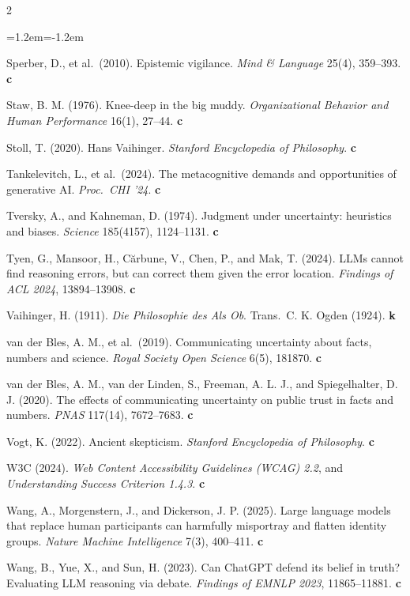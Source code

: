 \documentclass[11pt,a4paper]{article}
\newcounter{art}
\begin{document}
\begin{multicols}{2}
\begin{list}{}{\leftmargin=1.2em\itemindent=-1.2em\itemsep=1pt}
\item Sperber, D., et al.\ (2010). Epistemic vigilance. \textit{Mind \& Language} 25(4), 359--393. \textbf{c}
\item Staw, B. M. (1976). Knee-deep in the big muddy. \textit{Organizational Behavior and Human Performance} 16(1), 27--44. \textbf{c}
\item Stoll, T. (2020). Hans Vaihinger. \textit{Stanford Encyclopedia of Philosophy}. \textbf{c}
\item Tankelevitch, L., et al.\ (2024). The metacognitive demands and opportunities of generative AI. \textit{Proc.\ CHI '24}. \textbf{c}
\item Tversky, A., and Kahneman, D. (1974). Judgment under uncertainty: heuristics and biases. \textit{Science} 185(4157), 1124--1131. \textbf{c}
\item Tyen, G., Mansoor, H., Cărbune, V., Chen, P., and Mak, T. (2024). LLMs cannot find reasoning errors, but can correct them given the error location. \textit{Findings of ACL 2024}, 13894--13908. \textbf{c}
\item Vaihinger, H. (1911). \textit{Die Philosophie des Als Ob}. Trans.\ C. K. Ogden (1924). \textbf{k}
\item van der Bles, A. M., et al.\ (2019). Communicating uncertainty about facts, numbers and science. \textit{Royal Society Open Science} 6(5), 181870. \textbf{c}
\item van der Bles, A. M., van der Linden, S., Freeman, A. L. J., and Spiegelhalter, D. J. (2020). The effects of communicating uncertainty on public trust in facts and numbers. \textit{PNAS} 117(14), 7672--7683. \textbf{c}
\item Vogt, K. (2022). Ancient skepticism. \textit{Stanford Encyclopedia of Philosophy}. \textbf{c}
\item W3C (2024). \textit{Web Content Accessibility Guidelines (WCAG) 2.2}, and \textit{Understanding Success Criterion 1.4.3}. \textbf{c}
\item Wang, A., Morgenstern, J., and Dickerson, J. P. (2025). Large language models that replace human participants can harmfully misportray and flatten identity groups. \textit{Nature Machine Intelligence} 7(3), 400--411. \textbf{c}
\item Wang, B., Yue, X., and Sun, H. (2023). Can ChatGPT defend its belief in truth? Evaluating LLM reasoning via debate. \textit{Findings of EMNLP 2023}, 11865--11881. \textbf{c}
\end{list}
\end{multicols}
\end{document}
